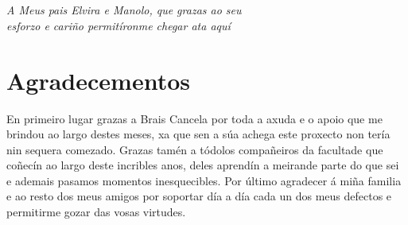 
\chapter*{}

\begin{flushright}
\emph{A Meus pais Elvira e Manolo, que grazas ao seu \\esforzo e cariño permitíronme chegar ata aquí}
\end{flushright}


\chapter*{Agradecementos}

En primeiro lugar grazas a Brais Cancela por toda a axuda e o apoio que me brindou 
ao largo destes meses, xa que sen a súa achega este proxecto non tería nin sequera comezado.
Grazas tamén a tódolos compañeiros da facultade que coñecín ao largo deste incribles anos,
deles aprendín a meirande parte do que sei e ademais pasamos momentos inesquecibles. Por
último agradecer á miña familia e ao resto dos meus amigos por soportar día a día cada 
un dos meus defectos e permitirme gozar das vosas virtudes.
